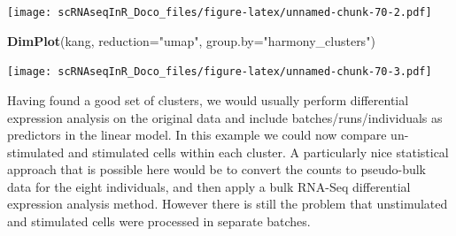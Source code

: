 \documentclass[
]{book}
\newenvironment{Shaded}{\begin{snugshade}}{\end{snugshade}}
\newcommand{\AttributeTok}[1]{\textcolor[rgb]{0.13,0.29,0.53}{#1}}
\newcommand{\CommentTok}[1]{\textcolor[rgb]{0.56,0.35,0.01}{\textit{#1}}}
\newcommand{\DecValTok}[1]{\textcolor[rgb]{0.00,0.00,0.81}{#1}}
\newcommand{\FloatTok}[1]{\textcolor[rgb]{0.00,0.00,0.81}{#1}}
\newcommand{\FunctionTok}[1]{\textcolor[rgb]{0.13,0.29,0.53}{\textbf{#1}}}
\newcommand{\NormalTok}[1]{#1}
\newcommand{\OtherTok}[1]{\textcolor[rgb]{0.56,0.35,0.01}{#1}}
\newcommand{\SpecialCharTok}[1]{\textcolor[rgb]{0.81,0.36,0.00}{\textbf{#1}}}
\newcommand{\StringTok}[1]{\textcolor[rgb]{0.31,0.60,0.02}{#1}}
\begin{document}
\begin{Shaded}
\end{Shaded}

\texttt{[image: scRNAseqInR\_Doco\_files/figure-latex/unnamed-chunk-70-2.pdf]}

\begin{Shaded}
\begin{Highlighting}[]
\FunctionTok{DimPlot}\NormalTok{(kang, }\AttributeTok{reduction=}\StringTok{"umap"}\NormalTok{, }\AttributeTok{group.by=}\StringTok{"harmony\_clusters"}\NormalTok{)}
\end{Highlighting}
\end{Shaded}

\texttt{[image: scRNAseqInR\_Doco\_files/figure-latex/unnamed-chunk-70-3.pdf]}

Having found a good set of clusters, we would usually perform differential expression analysis on the original data and include batches/runs/individuals as predictors in the linear model. In this example we could now compare un-stimulated and stimulated cells within each cluster. A particularly nice statistical approach that is possible here would be to convert the counts to pseudo-bulk data for the eight individuals, and then apply a bulk RNA-Seq differential expression analysis method. However there is still the problem that unstimulated and stimulated cells were processed in separate batches.
\end{document}
